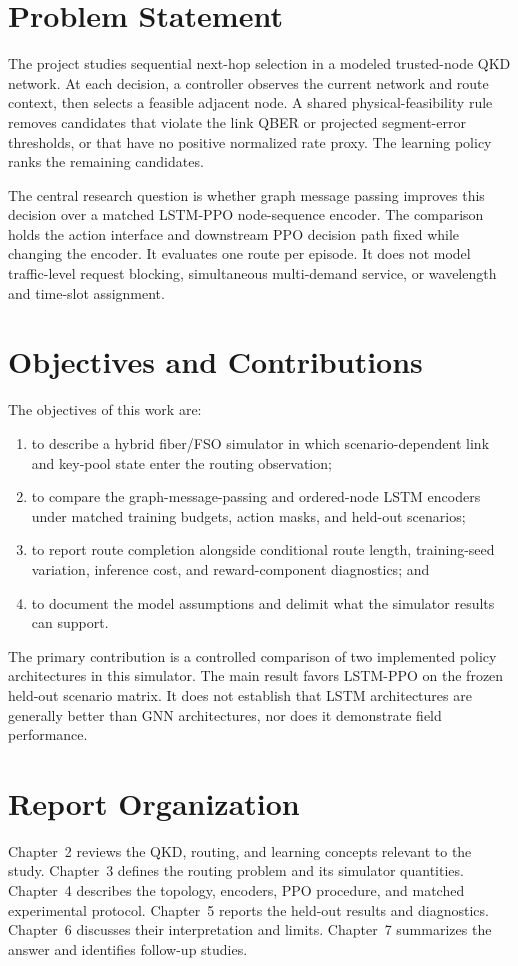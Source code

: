 \documentclass[12pt,a4paper,oneside]{report}
\begin{document}
\section{Problem Statement}
The project studies sequential next-hop selection in a modeled trusted-node QKD network. At each decision, a controller observes the current network and route context, then selects a feasible adjacent node. A shared physical-feasibility rule removes candidates that violate the link QBER or projected segment-error thresholds, or that have no positive normalized rate proxy. The learning policy ranks the remaining candidates.

The central research question is whether graph message passing improves this decision over a matched LSTM-PPO node-sequence encoder. The comparison holds the action interface and downstream PPO decision path fixed while changing the encoder. It evaluates one route per episode. It does not model traffic-level request blocking, simultaneous multi-demand service, or wavelength and time-slot assignment.

\section{Objectives and Contributions}
The objectives of this work are:
\begin{enumerate}
  \item to describe a hybrid fiber/FSO simulator in which scenario-dependent link and key-pool state enter the routing observation;
  \item to compare the graph-message-passing and ordered-node LSTM encoders under matched training budgets, action masks, and held-out scenarios;
  \item to report route completion alongside conditional route length, training-seed variation, inference cost, and reward-component diagnostics; and
  \item to document the model assumptions and delimit what the simulator results can support.
\end{enumerate}

The primary contribution is a controlled comparison of two implemented policy architectures in this simulator. The main result favors LSTM-PPO on the frozen held-out scenario matrix. It does not establish that LSTM architectures are generally better than GNN architectures, nor does it demonstrate field performance.

\section{Report Organization}
Chapter~2 reviews the QKD, routing, and learning concepts relevant to the study. Chapter~3 defines the routing problem and its simulator quantities. Chapter~4 describes the topology, encoders, PPO procedure, and matched experimental protocol. Chapter~5 reports the held-out results and diagnostics. Chapter~6 discusses their interpretation and limits. Chapter~7 summarizes the answer and identifies follow-up studies.
\end{document}
